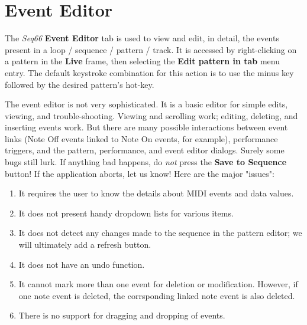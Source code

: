 %
%

\section{Event Editor}
\label{sec:event_editor}

   The \textsl{Seq66} \textbf{Event Editor} tab is used to view and edit,
   in detail, the events present in a loop / sequence / pattern / track.
   It is accessed by right-clicking on a pattern in the \textbf{Live} frame,
   then selecting the \textbf{Edit pattern in tab} menu entry.
   The default keystroke combination for this action is to use the minus key
   followed by the desired pattern's hot-key.

   The event editor is not very sophisticated.
   It is a basic editor for simple edits, viewing, and trouble-shooting.
   Viewing and scrolling work;
   editing, deleting, and inserting events work.
   But there are many possible interactions between event links
   (Note Off events linked to Note On events, for example),
   performance triggers, and the pattern,
   performance, and event editor dialogs.
   Surely some bugs still lurk.
   If anything bad happens, do \textsl{not} press the
   \textbf{Save to Sequence} button!
   If the application aborts, let us know!
   Here are the major "issues":

   \begin{enumerate}
      \item It requires the user to know the details
         about MIDI events and data values.
      \item It does not present handy dropdown lists for various items.
      \item It does not detect any changes made to the sequence in the
         pattern editor; we will ultimately add a refresh button.
      \item It does not have an undo function.
      \item It cannot mark more than one event for deletion or modification.
         However, if one note event is deleted, the corrsponding linked note
         event is also deleted.
      \item There is no support for dragging and dropping of events.
   \end{enumerate}

